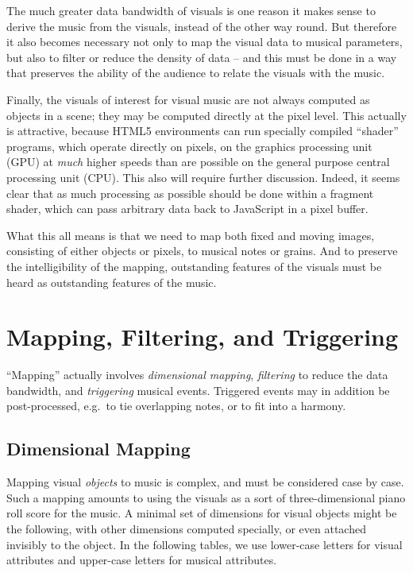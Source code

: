 \documentclass[english,11pt,letterpaper,onecolumn]{scrartcl}
\begin{document}
The much greater data bandwidth of visuals is one reason it makes 
sense to derive the music from the visuals, instead of the other way round. But 
therefore it also becomes necessary not only to map the visual data to musical 
parameters, but also to filter or reduce the density of data -- and this must 
be done in a way that preserves the ability of the audience to relate the 
visuals with the music.

Finally, the visuals of interest for visual music are not always 
computed as objects in a scene; they may be computed directly at the 
pixel level. This actually is attractive, because HTML5 environments can run 
specially compiled ``shader'' programs, which operate directly on pixels, on 
the graphics processing unit (GPU) at \emph{much} higher speeds than are 
possible on the general purpose central processing unit (CPU). This also will 
require further discussion. Indeed, it seems clear that as much processing as 
possible should be done within a fragment shader, which can pass arbitrary 
data back to JavaScript in a pixel buffer.

What this all means is that we need to map both fixed and moving images, 
consisting of either objects or pixels, to musical notes or grains. And to 
preserve the intelligibility of the mapping, outstanding features of the 
visuals must be heard as outstanding features of the music.

\section{Mapping, Filtering, and Triggering}

``Mapping'' actually involves \emph{dimensional mapping}, \emph{filtering} to 
reduce the data bandwidth, and \emph{triggering} musical events. Triggered 
events may in addition be post-processed, e.g.\ to tie overlapping notes, or 
to fit into a harmony.

\subsection{Dimensional Mapping}

Mapping visual \emph{objects} to music is complex, and must be considered case 
by case. Such a mapping amounts to using the visuals as a sort of 
three-dimensional piano roll score for the music. A minimal set of dimensions 
for visual objects might be the following, with other dimensions computed 
specially, or even attached invisibly to the object. In the following tables, 
we use lower-case letters for visual attributes and upper-case letters for 
musical attributes.
\end{document}
